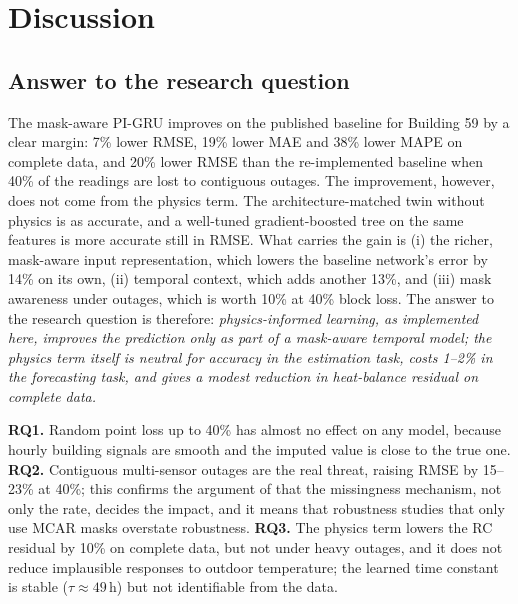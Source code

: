 \section{Discussion}\label{sec:disc}

\subsection{Answer to the research question}
The mask-aware PI-GRU improves on the published baseline for Building 59 by a clear margin: 7\% lower RMSE, 19\% lower MAE and 38\% lower MAPE on complete data, and 20\% lower RMSE than the re-implemented baseline when 40\% of the readings are lost to contiguous outages. The improvement, however, does not come from the physics term. The architecture-matched twin without physics is as accurate, and a well-tuned gradient-boosted tree on the same features is more accurate still in RMSE. What carries the gain is (i) the richer, mask-aware input representation, which lowers the baseline network's error by 14\% on its own, (ii) temporal context, which adds another 13\%, and (iii) mask awareness under outages, which is worth 10\% at 40\% block loss. The answer to the research question is therefore: \emph{physics-informed learning, as implemented here, improves the prediction only as part of a mask-aware temporal model; the physics term itself is neutral for accuracy in the estimation task, costs 1--2\% in the forecasting task, and gives a modest reduction in heat-balance residual on complete data.}

\textbf{RQ1.} Random point loss up to 40\% has almost no effect on any model, because hourly building signals are smooth and the imputed value is close to the true one. \textbf{RQ2.} Contiguous multi-sensor outages are the real threat, raising RMSE by 15--23\% at 40\%; this confirms the argument of \citet{lee2024missing} that the missingness mechanism, not only the rate, decides the impact, and it means that robustness studies that only use MCAR masks overstate robustness. \textbf{RQ3.} The physics term lowers the RC residual by 10\% on complete data, but not under heavy outages, and it does not reduce implausible responses to outdoor temperature; the learned time constant is stable ($\tau\approx49$\,h) but not identifiable from the data.

